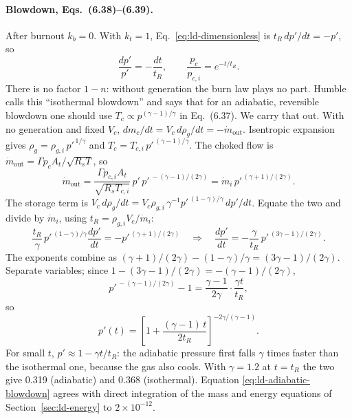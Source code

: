 \paragraph{Blowdown, Eqs.~(6.38)--(6.39).} After burnout
$k_b=0$. With $k_t=1$, Eq.~\eqref{eq:ld-dimensionless} is
$t_R\,dp'/dt=-p'$, so
\[
 \frac{dp'}{p'}=-\frac{dt}{t_R},\qquad
 \frac{p_c}{p_{c,i}}=e^{-t/t_R}.
\]
There is no factor $1-n$: without generation the burn law plays no
part. Humble calls this ``isothermal blowdown'' and says that for an
adiabatic, reversible blowdown one should use $T_c\propto
p^{(\gamma-1)/\gamma}$ in Eq.~(6.37). We carry that out. With no
generation and fixed $V_c$, $dm_c/dt=V_c\,d\rho_g/dt=-\dot m_{\mathrm{out}}$.
Isentropic expansion gives
$\rho_g=\rho_{g,i}\,p'^{\,1/\gamma}$ and
$T_c=T_{c,i}\,p'^{\,(\gamma-1)/\gamma}$. The choked flow is
$\dot m_{\mathrm{out}}=\Gamma p_cA_t/\sqrt{R_sT}$, so
\[
 \dot m_{\mathrm{out}}
 =\frac{\Gamma p_{c,i}A_t}{\sqrt{R_sT_{c,i}}}\,
  p'\,p'^{\,-(\gamma-1)/(2\gamma)}
 =\dot m_i\,p'^{\,(\gamma+1)/(2\gamma)} .
\]
The storage term is
$V_c\,d\rho_g/dt=V_c\rho_{g,i}\,\gamma^{-1}p'^{\,(1-\gamma)/\gamma}\,dp'/dt$.
Equate the two and divide by $\dot m_i$, using
$t_R=\rho_{g,i}V_c/\dot m_i$:
\[
 \frac{t_R}{\gamma}\,p'^{\,(1-\gamma)/\gamma}\frac{dp'}{dt}
 =-p'^{\,(\gamma+1)/(2\gamma)}
 \quad\Longrightarrow\quad
 \frac{dp'}{dt}=-\frac{\gamma}{t_R}\,p'^{\,(3\gamma-1)/(2\gamma)} .
\]
The exponents combine as
$(\gamma+1)/(2\gamma)-(1-\gamma)/\gamma=(3\gamma-1)/(2\gamma)$.
Separate variables; since $1-(3\gamma-1)/(2\gamma)=-(\gamma-1)/(2\gamma)$,
\[
 p'^{\,-(\gamma-1)/(2\gamma)}-1=\frac{\gamma-1}{2\gamma}\cdot
 \frac{\gamma t}{t_R},
\]
so
\begin{equation}\label{eq:ld-adiabatic-blowdown}
 p'(t)=\left[1+\frac{(\gamma-1)\,t}{2t_R}\right]^{-2\gamma/(\gamma-1)}.
\end{equation}
For small $t$, $p'\approx1-\gamma t/t_R$: the adiabatic pressure
first falls $\gamma$ times faster than the isothermal one, because
the gas also cools. With $\gamma=1.2$ at $t=t_R$ the two give 0.319
(adiabatic) and 0.368 (isothermal). Equation
\eqref{eq:ld-adiabatic-blowdown} agrees with direct integration of the
mass and energy equations of Section~\ref{sec:ld-energy} to
$2\times10^{-12}$.

